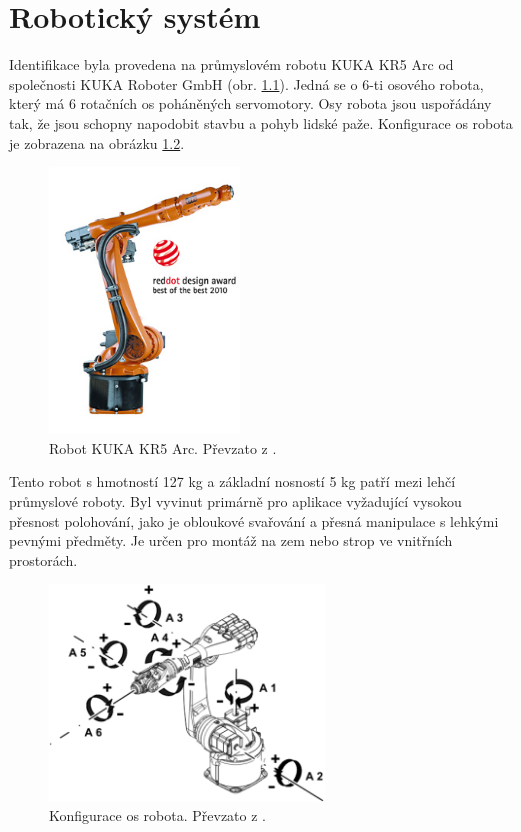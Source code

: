 

\chapter{Robotický systém}


Identifikace byla provedena na průmyslovém robotu KUKA KR5 Arc \cite{kuka_url} od společnosti KUKA Roboter GmbH (obr. \ref{kuka_kr5_pic}). Jedná se o 6-ti osového robota, který má 6 rotačních os poháněných servomotory. Osy robota jsou uspořádány tak, že jsou schopny napodobit stavbu a pohyb lidské paže. Konfigurace os robota je zobrazena na obrázku \ref{kuka_kr5_axes_pic}.  

\begin{figure}[ht]
\includegraphics[width=0.45\textwidth]{PR_KR5_arc_02}
\caption{Robot KUKA KR5 Arc. Převzato z \cite{kuka_datasheet_url}.}
\label{kuka_kr5_pic}
\end{figure}

Tento robot s hmotností 127 kg a základní nosností 5 kg patří mezi lehčí průmyslové roboty. Byl vyvinut primárně pro aplikace vyžadující vysokou přesnost polohování, jako je obloukové svařování a přesná manipulace s lehkými pevnými předměty. Je určen pro montáž na zem nebo strop ve vnitřních prostorách.

\begin{figure}[ht]
\includegraphics[width=0.65\textwidth]{kuka_kr5_axes}
\caption{Konfigurace os robota. Převzato z \cite{kuka_datasheet_url}.}
\label{kuka_kr5_axes_pic}
\end{figure}

